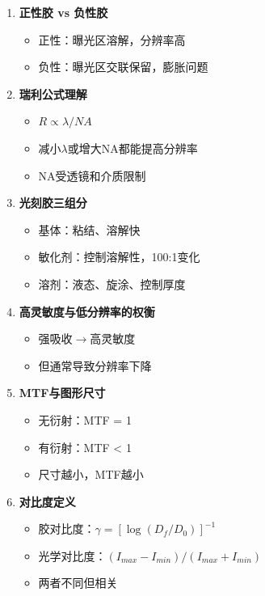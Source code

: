 \documentclass[UTF8,12pt,a4paper]{ctexart}
\begin{document}
\begin{enumerate}
    \item \textbf{正性胶 vs 负性胶}
    \begin{itemize}
        \item 正性：曝光区溶解，分辨率高
        \item 负性：曝光区交联保留，膨胀问题
    \end{itemize}
    
    \item \textbf{瑞利公式理解}
    \begin{itemize}
        \item $R \propto \lambda/NA$
        \item 减小$\lambda$或增大NA都能提高分辨率
        \item NA受透镜和介质限制
    \end{itemize}
    
    \item \textbf{光刻胶三组分}
    \begin{itemize}
        \item 基体：粘结、溶解快
        \item 敏化剂：控制溶解性，100:1变化
        \item 溶剂：液态、旋涂、控制厚度
    \end{itemize}
    
    \item \textbf{高灵敏度与低分辨率的权衡}
    \begin{itemize}
        \item 强吸收$\rightarrow$高灵敏度
        \item 但通常导致分辨率下降
    \end{itemize}
    
    \item \textbf{MTF与图形尺寸}
    \begin{itemize}
        \item 无衍射：MTF = 1
        \item 有衍射：MTF < 1
        \item 尺寸越小，MTF越小
    \end{itemize}
    
    \item \textbf{对比度定义}
    \begin{itemize}
        \item 胶对比度：$\gamma = [\log(D_f/D_0)]^{-1}$
        \item 光学对比度：$(I_{max}-I_{min})/(I_{max}+I_{min})$
        \item 两者不同但相关
    \end{itemize}
    

\end{enumerate}
\end{document}
